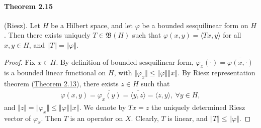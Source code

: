 \documentclass{article}
\begin{document}
\paragraph{Theorem 2.15\label{thm:2.15}} (Riesz). Let $H$ be a Hilbert space, and let $\varphi$ be a bounded sesquilinear form on $H$. Then there exists uniquely $T\in\mathfrak{B}(H)$ such that $\varphi(x,y)=\langle Tx,y\rangle$ for all $x,y\in H$, and $\Vert T\Vert = \Vert \varphi\Vert$.
\begin{proof}
Fix $x\in H$. By definition of bounded sesquilinear form, $\varphi_x(\cdot) = \overline{\varphi(x,\cdot)}$ is a bounded linear functional on $H$, with $\Vert\varphi_x\Vert\leq\left\Vert \varphi\right\Vert\left\Vert x\right\Vert$.
By Riesz representation theorem (\hyperref[thm:2.13]{Theorem 2.13}), there exists $z\in H$ such that
\begin{align*}
	\varphi(x,y)=\overline{\varphi_x(y)} = \overline{\langle y,z\rangle} = \langle z,y\rangle,\ \forall y\in H,
\end{align*}
and $\Vert z\Vert =\Vert\varphi_x\Vert\leq \left\Vert \varphi\right\Vert\left\Vert x\right\Vert$. We denote by $Tx=z$ the uniquely determined Riesz vector of $\varphi_x$. Then $T$ is an operator on $X$. Clearly, $T$ is linear, and $\Vert T\Vert \leq \Vert \varphi\Vert$.
\end{proof}
\end{document}
